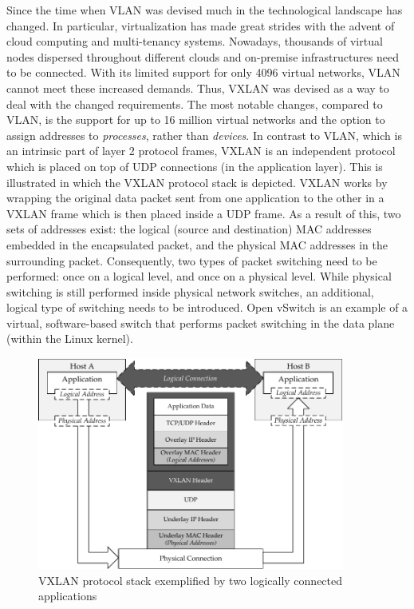 Since the time when VLAN was devised much in the technological landscape has changed. In particular, virtualization has made great strides with the advent of cloud computing and multi-tenancy systems. Nowadays, thousands of virtual nodes dispersed throughout different clouds and on-premise infrastructures need to be connected. With its limited support for only 4096 virtual networks, VLAN cannot meet these increased demands. Thus, VXLAN was devised as a way to deal with the changed requirements.
The most notable changes, compared to VLAN, is the support for up to 16 million virtual networks and the option to assign addresses to \emph{processes}, rather than \emph{devices}.
In contrast to VLAN, which is an intrinsic part of layer 2 protocol frames, VXLAN is an independent protocol which is placed on top of UDP connections (in the application layer). This is illustrated  in which the VXLAN protocol stack is depicted. VXLAN works by wrapping the original data packet sent from one application to the other in a VXLAN frame which is then placed inside a UDP frame. As a result of this, two sets of addresses exist: the logical (source and destination) MAC addresses embedded in the encapsulated packet, and the physical MAC addresses in the surrounding packet.
Consequently, two types of packet switching need to be performed: once on a logical level, and once on a physical level. While physical switching is still performed inside physical network switches, an additional, logical type of switching needs to be introduced. Open vSwitch \cite{pfaff2015design} is an example of a virtual, software-based switch that performs packet switching in the data plane (within the Linux kernel).

\begin{figure}[htpb]
  \centering
  \includegraphics[width=0.9\textwidth]{figures/vxlan.pdf}
  \caption[VXLAN protocol stack]{VXLAN protocol stack exemplified by two logically connected applications}\label{fig:vxlan}
\end{figure}

